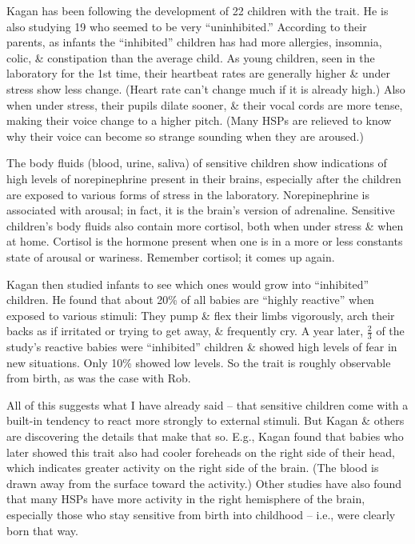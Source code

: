 \documentclass{article}
\numberwithin{equation}{section}
\begin{document}
Kagan has been following the development of 22 children with the trait. He is also studying 19 who seemed to be very ``uninhibited.'' According to their parents, as infants the ``inhibited'' children has had more allergies, insomnia, colic, \& constipation than the average child. As young children, seen in the laboratory for the 1st time, their heartbeat rates are generally higher \& under stress show less change. (Heart rate can't change much if it is already high.) Also when under stress, their pupils dilate sooner, \& their vocal cords are more tense, making their voice change to a higher pitch. (Many HSPs are relieved to know why their voice can become so strange sounding when they are aroused.)

The body fluids (blood, urine, saliva) of sensitive children show indications of high levels of norepinephrine present in their brains, especially after the children are exposed to various forms of stress in the laboratory. Norepinephrine is associated with arousal; in fact, it is the brain's version of adrenaline. Sensitive children's body fluids also contain more cortisol, both when under stress \& when at home. Cortisol is the hormone present when one is in a more or less constants state of arousal or wariness. Remember cortisol; it comes up again.

Kagan then studied infants to see which ones would grow into ``inhibited'' children. He found that about 20\% of all babies are ``highly reactive'' when exposed to various stimuli: They pump \& flex their limbs vigorously, arch their backs as if irritated or trying to get away, \& frequently cry. A year later, $\frac{2}{3}$ of the study's reactive babies were ``inhibited'' children \& showed high levels of fear in new situations. Only 10\% showed low levels. So the trait is roughly observable from birth, as was the case with Rob.

All of this suggests what I have already said -- that sensitive children come with a built-in tendency to react more strongly to external stimuli. But Kagan \& others are discovering the details that make that so. E.g., Kagan found that babies who later showed this trait also had cooler foreheads on the right side of their head, which indicates greater activity on the right side of the brain. (The blood is drawn away from the surface toward the activity.) Other studies have also found that many HSPs have more activity in the right hemisphere of the brain, especially those who stay sensitive from birth into childhood -- i.e., were clearly born that way.
\end{document}
